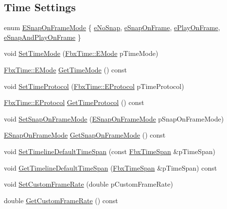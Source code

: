 \subsection*{Time Settings}
\begin{DoxyCompactItemize}
\item 
enum \hyperlink{class_fbx_global_settings_ada0423e32bb00b73cb43b94d54c54b4a}{E\+Snap\+On\+Frame\+Mode} \{ \hyperlink{class_fbx_global_settings_ada0423e32bb00b73cb43b94d54c54b4aa8be027fb209b6d7c9217f83d63bfe1f3}{e\+No\+Snap}, 
\hyperlink{class_fbx_global_settings_ada0423e32bb00b73cb43b94d54c54b4aa8c3a7be022764e51600e7128725ab74a}{e\+Snap\+On\+Frame}, 
\hyperlink{class_fbx_global_settings_ada0423e32bb00b73cb43b94d54c54b4aa0f6d2833b7029016b80bc42ef7e25433}{e\+Play\+On\+Frame}, 
\hyperlink{class_fbx_global_settings_ada0423e32bb00b73cb43b94d54c54b4aa46219a7a0a88effe8daa2a1f41694796}{e\+Snap\+And\+Play\+On\+Frame}
 \}
\item 
void \hyperlink{class_fbx_global_settings_a7356a58403a96b96f9d4a5d8513dc731}{Set\+Time\+Mode} (\hyperlink{class_fbx_time_acc529b00a0e8d4c3da3702449ca93031}{Fbx\+Time\+::\+E\+Mode} p\+Time\+Mode)
\item 
\hyperlink{class_fbx_time_acc529b00a0e8d4c3da3702449ca93031}{Fbx\+Time\+::\+E\+Mode} \hyperlink{class_fbx_global_settings_af9b3a1685ccc3ed00f8addec82ca8a23}{Get\+Time\+Mode} () const
\item 
void \hyperlink{class_fbx_global_settings_ac3116e61ac13970a735d641b40b44382}{Set\+Time\+Protocol} (\hyperlink{class_fbx_time_a10ffa1fdce0aa7f63ec24bdd23afff4b}{Fbx\+Time\+::\+E\+Protocol} p\+Time\+Protocol)
\item 
\hyperlink{class_fbx_time_a10ffa1fdce0aa7f63ec24bdd23afff4b}{Fbx\+Time\+::\+E\+Protocol} \hyperlink{class_fbx_global_settings_a1514e7da28ac65299ee142c3376fb4e7}{Get\+Time\+Protocol} () const
\item 
void \hyperlink{class_fbx_global_settings_a4437203e7bfa3463d234154c9e3dc0c2}{Set\+Snap\+On\+Frame\+Mode} (\hyperlink{class_fbx_global_settings_ada0423e32bb00b73cb43b94d54c54b4a}{E\+Snap\+On\+Frame\+Mode} p\+Snap\+On\+Frame\+Mode)
\item 
\hyperlink{class_fbx_global_settings_ada0423e32bb00b73cb43b94d54c54b4a}{E\+Snap\+On\+Frame\+Mode} \hyperlink{class_fbx_global_settings_a2f7b9c64f16aed022e95504944076cf1}{Get\+Snap\+On\+Frame\+Mode} () const
\item 
void \hyperlink{class_fbx_global_settings_a5630686adea391bf0dc542380c8d89fe}{Set\+Timeline\+Default\+Time\+Span} (const \hyperlink{class_fbx_time_span}{Fbx\+Time\+Span} \&p\+Time\+Span)
\item 
void \hyperlink{class_fbx_global_settings_a1b2f291c9da96c693c79bcd6a4115648}{Get\+Timeline\+Default\+Time\+Span} (\hyperlink{class_fbx_time_span}{Fbx\+Time\+Span} \&p\+Time\+Span) const
\item 
void \hyperlink{class_fbx_global_settings_a12426551edf226877e000f3ca00e93b1}{Set\+Custom\+Frame\+Rate} (double p\+Custom\+Frame\+Rate)
\item 
double \hyperlink{class_fbx_global_settings_a70888edefedf6502041a00f0751e2f11}{Get\+Custom\+Frame\+Rate} () const
\end{DoxyCompactItemize}
